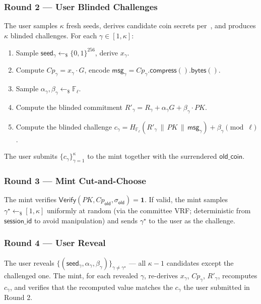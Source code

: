\subsubsection{Round 2 --- User Blinded Challenges}
\label{sec:refresh-r2}

The user samples $\kappa$ fresh seeds, derives candidate coin secrets per~, and produces $\kappa$ blinded challenges. For each $\gamma \in [1, \kappa]$:
\begin{enumerate}[leftmargin=2em,itemsep=0.1em]
  \item Sample $\mathsf{seed}_\gamma \leftarrow_\$ \{0,1\}^{256}$, derive $x_\gamma$.
  \item Compute $Cp_\gamma = x_\gamma \cdot G$, encode $\mathsf{msg}_\gamma = Cp_\gamma.\mathsf{compress}().\mathsf{bytes}()$.
  \item Sample $\alpha_\gamma, \beta_\gamma \leftarrow_\$ \mathbb{F}_\ell$.
  \item Compute the blinded commitment $R'_\gamma = R_\gamma + \alpha_\gamma G + \beta_\gamma \cdot PK$.
  \item Compute the blinded challenge $c_\gamma = H_{\mathbb{F}_\ell}(R'_\gamma \,\|\, PK \,\|\, \mathsf{msg}_\gamma) + \beta_\gamma \pmod{\ell}$.
\end{enumerate}
The user submits $\{c_\gamma\}_{\gamma=1}^{\kappa}$ to the mint together with the surrendered $\mathsf{old\_coin}$.

\subsubsection{Round 3 --- Mint Cut-and-Choose}
\label{sec:refresh-r3}

The mint verifies $\mathsf{Verify}(PK, Cp_{\mathsf{old}}, \sigma_{\mathsf{old}}) = \mathbf{1}$. If valid, the mint samples $\gamma^\star \leftarrow_\$ [1, \kappa]$ uniformly at random (via the committee VRF; deterministic from $\mathsf{session\_id}$ to avoid manipulation) and sends $\gamma^\star$ to the user as the challenge.

\subsubsection{Round 4 --- User Reveal}
\label{sec:refresh-r4}

The user reveals $\{ (\mathsf{seed}_\gamma, \alpha_\gamma, \beta_\gamma) \}_{\gamma \neq \gamma^\star}$ --- all $\kappa - 1$ candidates except the challenged one. The mint, for each revealed $\gamma$, re-derives $x_\gamma$, $Cp_\gamma$, $R'_\gamma$, recomputes $c_\gamma$, and verifies that the recomputed value matches the $c_\gamma$ the user submitted in Round 2.

